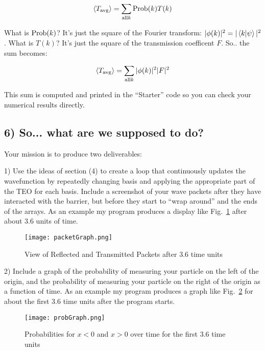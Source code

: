 \documentclass[11pt]{article} %
\begin{document}
\begin{equation}
\langle T_{\rm avg} \rangle = \sum_{{\rm all }k} {\rm Prob }(k) T(k)
\end{equation}

What is ${\rm Prob }(k)$? It's just the square of the Fourier transform: $|\phi(k)|^2 = |\braket{k|\psi}|^2$. What is $T(k)$? It's just the square of the transmission coefficent $F$. So.. the sum becomes:

\begin{equation}
\langle T_{\rm avg} \rangle = \sum_{{\rm all }k} |\phi(k)|^2 |F|^2
\end{equation}

This sum is computed and printed in the ``Starter'' code so you can check your numerical results directly.

\subsection*{6) So... what are we supposed to do?}

Your mission is to produce two deliverables:

1) Use the ideas of section (4) to create a loop that continuously updates the wavefunction by repeatedly changing basis and applying the appropriate part of the TEO for each basis. Include a screenshot of your wave packets after they have interacted with the barrier, but before they start to ``wrap around'' and the ends of the arrays. As an example my program produces a display like Fig.~\ref{fig:packetGraph} after about 3.6 units of time.

\begin{figure}[htbp] %
   \centering
   \texttt{[image: packetGraph.png]} 
   \caption{View of Reflected and Transmitted Packets after 3.6 time units}
   \label{fig:packetGraph}
\end{figure}

2) Include a graph of the probability of measuring your particle on the left of the origin, and the probability of measuring your particle on the right of the origin as a function of time. As an example my program produces a graph like Fig.~\ref{fig:probGraph} for about the first 3.6 time units after the program starts.

\begin{figure}[htbp] %
   \centering
   \texttt{[image: probGraph.png]} 
   \caption{Probabilities for $x<0$ and $x>0$ over time for the first 3.6 time units}
   \label{fig:probGraph}
\end{figure}
\end{document}
